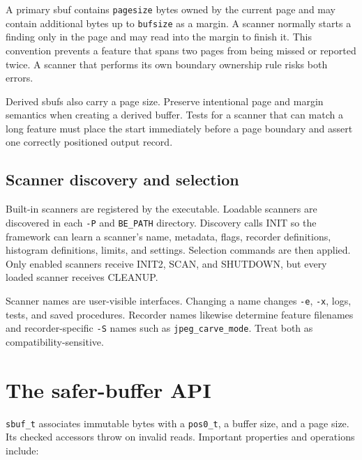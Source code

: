 \documentclass[11pt]{article}
\newcommand{\code}[1]{\texttt{#1}}
\begin{document}
A primary sbuf contains \code{pagesize} bytes owned by the current page and may
contain additional bytes up to \code{bufsize} as a margin. A scanner normally
starts a finding only in the page and may read into the margin to finish it.
This convention prevents a feature that spans two pages from being missed or
reported twice. A scanner that performs its own boundary ownership rule risks
both errors.

Derived sbufs also carry a page size. Preserve intentional page and margin
semantics when creating a derived buffer. Tests for a scanner that can match a
long feature must place the start immediately before a page boundary and
assert one correctly positioned output record.

\subsection{Scanner discovery and selection}

Built-in scanners are registered by the executable. Loadable scanners are
discovered in each \code{-P} and \code{BE\_PATH} directory. Discovery calls
INIT so the framework can learn a scanner's name, metadata, flags, recorder
definitions, histogram definitions, limits, and settings. Selection commands
are then applied. Only enabled scanners receive INIT2, SCAN, and SHUTDOWN, but
every loaded scanner receives CLEANUP.

Scanner names are user-visible interfaces. Changing a name changes \code{-e},
\code{-x}, logs, tests, and saved procedures. Recorder names likewise determine
feature filenames and recorder-specific \code{-S} names such as
\code{jpeg\_carve\_mode}. Treat both as compatibility-sensitive.

\section{The safer-buffer API}

\code{sbuf\_t} associates immutable bytes with a \code{pos0\_t}, a buffer size,
and a page size. Its checked accessors throw on invalid reads. Important
properties and operations include:
\end{document}
